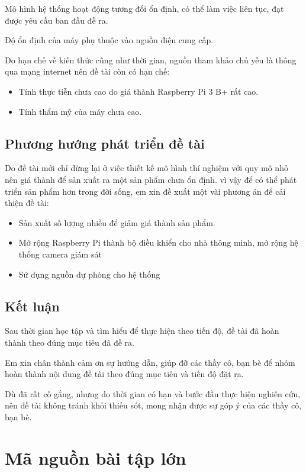 \documentclass{article}
\begin{document}
Mô hình hệ thống hoạt động tương đối ổn định, có thể làm việc liên tục, đạt được yêu cầu ban đầu đề ra.

Độ ổn định của máy phụ thuộc vào nguồn điện cung cấp.

Do hạn chế về kiến thức cũng như thời gian, nguồn tham khảo chủ yếu là thông qua mạng internet nên đề tài còn có hạn chế:

\begin{itemize}
\item Tính thực tiễn chưa cao do giá thành Raspberry Pi 3 B+ rất cao.
\item Tính thẩm mỹ của máy chưa cao.
\end{itemize}
\subsection{Phương hướng phát triển đề tài}
Do đề tài mới chỉ dừng lại ở việc thiết kế mô hình thí nghiệm với quy mô nhỏ nên giá thành để sản xuất ra một sản phẩm chưa ổn định. vì vậy để có thể phát triển sản phẩm hơn trong đời sống, em xin đề xuất một vài phương án để cải thiện đề tài:
\begin{itemize}
\item Sản xuất số lượng nhiều để giảm giá thành sản phẩm.
\item Mở rộng Raspberry Pi thành bộ điều khiển cho nhà thông minh, mở rộng hệ thống camera giám sát
\item Sử dụng nguồn dự phòng cho hệ thống 
\end{itemize}
\subsection{Kết luận}
Sau thời gian học tập và tìm hiểu để thực hiện theo tiến độ, đề tài đã hoàn thành theo đúng mục tiêu đã đề ra.

Em xin chân thành cảm ơn sự hướng dẫn, giúp đỡ các thầy cô, bạn bè để nhóm hoàn thành nội dung đề tài theo đúng mục tiêu và tiến độ đặt ra.

Dù đã rất cố gắng, nhưng do thời gian có hạn và bước đầu thực hiện nghiên cứu, nên đề tài không tránh khỏi thiếu sót, mong nhận được sự góp ý của các thầy cô, bạn bè.

\newpage

\appendix

\section{Mã nguồn bài tập lớn}
\end{document}
